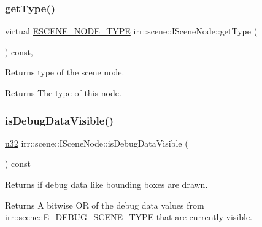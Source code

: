 \subsubsection{\texorpdfstring{get\+Type()}{getType()}\hspace{0.1cm}{\footnotesize\ttfamily [2/2]}}
{\footnotesize\ttfamily virtual \hyperlink{namespaceirr_1_1scene_acad3d7ef92a9807d391ba29120f3b7bd}{E\+S\+C\+E\+N\+E\+\_\+\+N\+O\+D\+E\+\_\+\+T\+Y\+PE} irr\+::scene\+::\+I\+Scene\+Node\+::get\+Type (\begin{DoxyParamCaption}{ }\end{DoxyParamCaption}) const\hspace{0.3cm}{\ttfamily [inline]}, {\ttfamily [virtual]}}



Returns type of the scene node. 

\begin{DoxyReturn}{Returns}
The type of this node. 
\end{DoxyReturn}
\mbox{\label{classirr_1_1scene_1_1ISceneNode_ad35515d81242e24c8b831bf29a555221}} 
\subsubsection{\texorpdfstring{is\+Debug\+Data\+Visible()}{isDebugDataVisible()}\hspace{0.1cm}{\footnotesize\ttfamily [1/2]}}
{\footnotesize\ttfamily \hyperlink{namespaceirr_a0416a53257075833e7002efd0a18e804}{u32} irr\+::scene\+::\+I\+Scene\+Node\+::is\+Debug\+Data\+Visible (\begin{DoxyParamCaption}{ }\end{DoxyParamCaption}) const\hspace{0.3cm}{\ttfamily [inline]}}



Returns if debug data like bounding boxes are drawn. 

\begin{DoxyReturn}{Returns}
A bitwise OR of the debug data values from \hyperlink{namespaceirr_1_1scene_a52b664c4c988113735042b168fc32dbe}{irr\+::scene\+::\+E\+\_\+\+D\+E\+B\+U\+G\+\_\+\+S\+C\+E\+N\+E\+\_\+\+T\+Y\+PE} that are currently visible. 
\end{DoxyReturn}
\mbox{\label{classirr_1_1scene_1_1ISceneNode_ad35515d81242e24c8b831bf29a555221}} 
